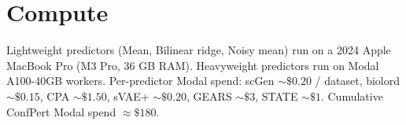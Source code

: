 \documentclass{article}
\begin{document}
\section{Compute}
\label{app:compute}

Lightweight predictors (Mean, Bilinear ridge, Noisy mean) run on a 2024 Apple MacBook Pro (M3 Pro, 36 GB RAM). Heavyweight predictors run on Modal A100-40GB workers. Per-predictor Modal spend: scGen $\sim\$0.20$ / dataset, biolord $\sim\$0.15$, CPA $\sim\$1.50$, sVAE+ $\sim\$0.20$, GEARS $\sim\$3$, STATE $\sim\$1$. Cumulative ConfPert Modal spend $\approx \$180$.



\end{document}

